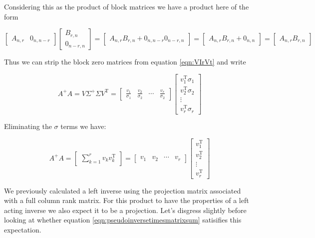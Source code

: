 \documentclass{article}      %
\newcommand{\T}[0]{\text{T}}
\begin{document}
Considering this as the product of block matrices we have a product here of the form

\[
\begin{bmatrix}
A_{n,r} & 0_{n,n-r}
\end{bmatrix}
\begin{bmatrix}
B_{r,n} \\ 0_{n-r,n}
\end{bmatrix}
=
\begin{bmatrix}
A_{n,r} B_{r,n} + 0_{n,n-r} 0_{n-r,n}
\end{bmatrix}
=
\begin{bmatrix}
A_{n,r} B_{r,n} + 0_{n,n}
\end{bmatrix}
=
\begin{bmatrix}
A_{n,r} B_{r,n}
\end{bmatrix}
\]

Thus we can strip the block zero matrices from equation \ref{eqn:VIrVt} and write

\begin{equation}\label{eqn:pseudoinversetimesmatrix}
A^{+} A =
V \Sigma^{+} \Sigma V^\T 
=
\begin{bmatrix}
\frac{v_1}{\sigma_1} & \frac{v_2}{\sigma_2} & \cdots & \frac{v_r}{\sigma_2} 
\end{bmatrix}
\begin{bmatrix}
v_1^\T \sigma_1 \\ v_2^\T \sigma_2 \\ \vdots \\ v_r^\T \sigma_r 
\end{bmatrix}
\end{equation}

Eliminating the $\sigma$ terms we have:

\begin{equation}\label{eqn:pseudoinversetimesmatrixsum}
A^{+} A =
\begin{bmatrix}
\sum_{k=1}^r {v_k}v_k^\T
\end{bmatrix}
=
\begin{bmatrix}
v_1 & v_2 & \cdots & v_r 
\end{bmatrix}
\begin{bmatrix}
v_1^\T \\ v_2^\T \\ \vdots \\ v_r^\T 
\end{bmatrix}
\end{equation}

We previously calculated a left inverse using the projection matrix associated with a full column rank matrix.  For this product to have the properties of a
left acting inverse we also expect it to be a projection.
Let's disgress
slightly before looking at whether equation
\ref{eqn:pseudoinversetimesmatrixsum} satisifies this expectation.
\end{document}
